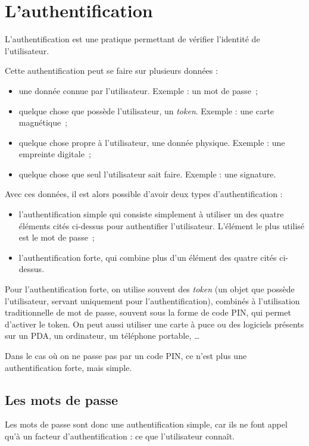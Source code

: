 \section{L'authentification\label{sec:Authentification}}
L'authentification est une pratique permettant de vérifier
l'identité de l'utilisateur.

Cette authentification peut se faire sur plusieurs données : 
\begin{itemize}
  \item une donnée connue par l'utilisateur. Exemple : un mot de
passe~;
  \item quelque chose que possède l'utilisateur, un \emph{token}.
Exemple : une carte magnétique~;
  \item quelque chose propre à l'utilisateur, une donnée physique.
Exemple : une empreinte digitale~;
  \item quelque chose que seul l'utilisateur sait faire. Exemple :
une signature.
\\
\end{itemize}

Avec ces données, il est alors possible d'avoir deux types
d'authentification : 
\begin{itemize}
  \item l'authentification simple qui consiste simplement à
utiliser un des quatre éléments cités ci-dessus pour authentifier
l'utilisateur. L'élément le plus utilisé est le mot de passe~;
  \item l'authentification forte, qui combine plus d'un élément
des quatre cités ci-dessus.
\\
\end{itemize}

Pour l'authentification forte, on utilise souvent des
\emph{token} (un objet que possède l'utilisateur, servant
uniquement pour l'authentification), 
combinés à l'utilisation traditionnelle de mot de passe, souvent
sous la forme de code PIN, qui permet d'activer le token.
On peut aussi utiliser une carte à puce ou des logiciels présents
sur un PDA, un ordinateur, un téléphone portable, …

Dans le cas où on ne passe pas par un code PIN, ce n'est plus une
authentification forte, mais simple.

\subsection{Les mots de passe}
Les mots de passe sont donc une authentification simple, car ils
ne font appel qu'à un facteur d'authentification : ce que
l'utilisateur connaît. 

